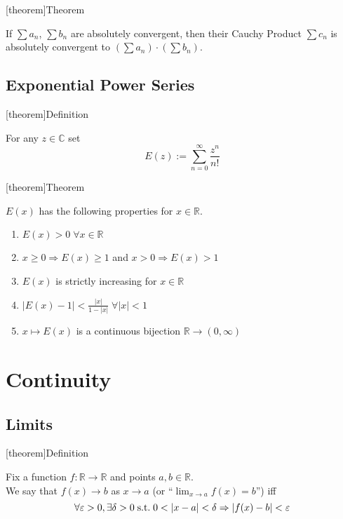 \documentclass[12pt]{report}
\theoremstyle{definition}
\begin{document}
[theorem]{Theorem}
\begin{Cauchuy Product convergence}
    If $\sum a_n$, $\sum b_n$ are absolutely convergent, then their Cauchy Product $\sum c_n$ 
    is absolutely convergent to $\left(\sum a_n\right) \cdot \left(\sum b_n\right)$.
\end{Cauchuy Product convergence}

\section{Exponential Power Series}
[theorem]{Definition}
\begin{exp series}
    For any $z  \in \mathbb{C}$ set \[
        E(z) := \sum_{n=0}^{\infty} \frac{z^{n}}{n!}
    \]
\end{exp series}

[theorem]{Theorem}
\begin{exp series properties}
    $E(x)$ has the following properties for $x \in \mathbb{R}$.
    \begin{enumerate}
        \item $E(x) > 0 \;\forall x \in \mathbb{R}$
        \item $x \ge 0 \Rightarrow E(x) \ge 1$ and $x > 0 \Rightarrow E(x) > 1$
        \item $E(x)$ is strictly increasing for $x \in \mathbb{R}$
        \item $|E(x) - 1| < \frac{|x|}{1 - |x|} \;\forall |x| < 1$
        \item $x \mapsto E(x)$ is a continuous bijection $\mathbb{R} \rightarrow (0, \infty)$
    \end{enumerate}
\end{exp series properties}

\chapter{Continuity}
\section{Limits}
[theorem]{Definition}
\begin{limit}
    Fix a function $f:\mathbb{R} \rightarrow \mathbb{R}$ and points $a,b \in \mathbb{R}$.
    \\We say that $f(x) \rightarrow b$ as $x \rightarrow a$ (or ``$\lim_{x\rightarrow a} f(x) = b$'') iff\[
        \forall \varepsilon > 0, \exists \delta > 0 \;\textnormal{s.t.}\; 0 < |x-a| < \delta
        \Rightarrow |f(x) - b| < \varepsilon
    \]
\end{limit}
\end{document}
